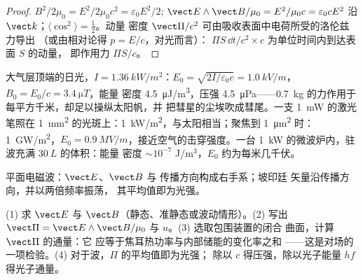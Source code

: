 \begin{proof}
$B^2/2\mu_0 = E^2/2\mu_0c^2 = \varepsilon_0E^2/2$; $\vect E\wedge\vect B/\mu_0 = E^2/\mu_0c =
\varepsilon_0cE^2$ 沿 $\vect k$；$\langle\cos^2\rangle = \tfrac12$。动量
密度 $\vect\Pi/c^2$ 可由吸收表面中电荷所受的洛伦兹力导出
（或由相对论得 $p = E/c$，对光而言）：
$\Pi S\,\dd t/c^2\times c$ 为单位时间内到达表面 $S$ 的动量，
即作用力 $\Pi S/c$。
\end{proof}

\begin{example}[日光、激光与微波]\label{ex:b2:poynting-vector:orders}
大气层顶端的日光，$I = \qty{1.36}{kW/m^2}$：$E_0 =
\sqrt{2I/\varepsilon_0c} = \qty{1.0}{kV/m}$，$B_0 = E_0/c = \qty{3.4}{\micro T}$，能量
密度 \qty{4.5}{\micro J/m^3}，压强 \qty{4.5}{\micro Pa}——\qty{0.7}{kg}
的力作用于每平方千米，却足以操纵太阳帆，并
把彗星的尘埃吹成彗尾。一支 \qty{1}{mW} 的激光笔照在
\qty{1}{mm^2} 的光斑上：\qty{1}{kW/m^2}，与太阳相当；聚焦到 \qty{1}{\micro m^2} 时：
\qty{1}{GW/m^2}，$E_0 = \qty{0.9}{MV/m}$，接近空气的击穿强度。一台
\qty{1}{kW} 的微波炉内，驻波充满 $\qty{30}{L}$ 的体积：能量
密度 $\sim 10^{-7}$ J/m$^3$，$E_0$ 约为每米几千伏。
\end{example}

\begin{omfigure}

{\small 平面电磁波：$\vect E$、$\vect B$ 与
传播方向构成右手系；坡印廷
矢量沿传播方向，并以两倍频率振荡，
其平均值即为光强。}
\end{omfigure}

\begin{method}[能量核算]\label{met:b2:poynting-vector:method}
(1) 求 $\vect E$ 与 $\vect B$（静态、准静态或波动情形）。(2)
写出 $\vect\Pi = \vect E\wedge\vect B/\mu_0$ 与 $u$。(3) 选取包围装置的闭合
曲面，计算 $\vect\Pi$ 的通量：它
应等于焦耳热功率与内部储能的变化率之和
——这是对场的一项检验。(4) 对于波，$\Pi$ 的平均值即为光强；
除以 $c$ 得压强，除以光子能量
$hf$ 得光子通量。
\end{method}

